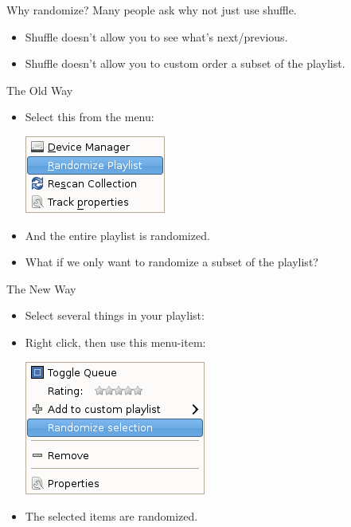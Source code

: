 \documentclass{beamer}
\begin{document}
\begin{frame}{Why randomize?}
  Many people ask why not just use shuffle.
  \begin{itemize}
    \item Shuffle doesn't allow you to see what's next/previous.
	\item Shuffle doesn't allow you to custom order a subset of the playlist.
  \end{itemize}
\end{frame}

\begin{frame}{The Old Way}
  \begin{itemize}
    \item Select this from the menu:

    \includegraphics[keepaspectratio]{images/tools-menu.png}
    \item And the entire playlist is randomized.
	\item What if we only want to randomize a subset of the playlist?
  \end{itemize}
\end{frame}

\begin{frame}{The New Way}
  \begin{itemize}
  \item Select several things in your playlist:
  \item Right click, then use this menu-item:

    \includegraphics[keepaspectratio]{images/randomize-menu-item.png}
  \item The selected items are randomized.
  \end{itemize}
\end{frame}
\end{document}
